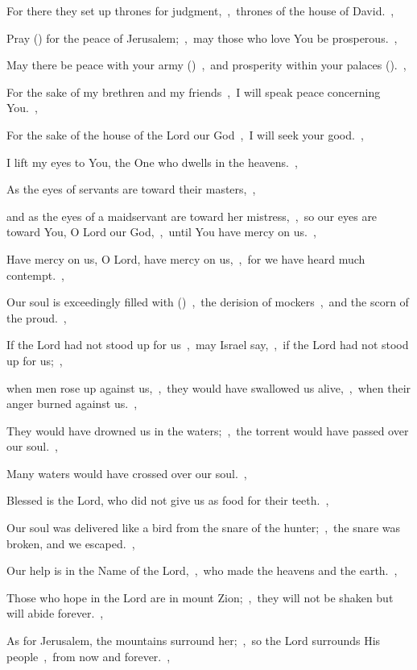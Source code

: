 \documentclass[12pt,twoside,a5paper]{article}
\begin{document}
\begin{halfparskip}
  For there they set up thrones for judgment,~\sep\ thrones of the house of David.~\sep

  Pray () for the peace of Jerusalem;~\sep\ may those who love You be prosperous.~\sep

  May there be peace with your army ()~\sep\ and prosperity within your palaces ().~\sep

  For the sake of my brethren and my friends~\sep\ I will speak peace concerning You.~\sep

  For the sake of the house of the Lord our God~\sep\ I will seek your good.~\sep

   I lift my eyes to You, the One who dwells in the heavens.~\sep

  As the eyes of servants are toward their masters,~\sep

  and as the eyes of a maidservant are toward her mistress,~\sep\ so our eyes are toward You, O Lord our God,~\sep\ until You have mercy on us.~\sep

  Have mercy on us, O Lord, have mercy on us,~\sep\ for we have heard much contempt.~\sep

  Our soul is exceedingly filled with ()~\sep\ the derision of mockers~\sep\ and the scorn of the proud.~\sep

   If the Lord had not stood up for us~\sep\ may Israel say,~\sep\ if the Lord had not stood up for us;~\sep

  when men rose up against us,~\sep\ they would have swallowed us alive,~\sep\ when their anger burned against us.~\sep

  They would have drowned us in the waters;~\sep\ the torrent would have passed over our soul.~\sep

  Many waters would have crossed over our soul.~\sep

  Blessed is the Lord, who did not give us as food for their teeth.~\sep

  Our soul was delivered like a bird from the snare of the hunter;~\sep\ the snare was broken, and we escaped.~\sep

  Our help is in the Name of the Lord,~\sep\ who made the heavens and the earth.~\sep

   Those who hope in the Lord are in mount Zion;~\sep\ they will not be shaken but will abide forever.~\sep

  As for Jerusalem, the mountains surround her;~\sep\ so the Lord surrounds His people~\sep\ from now and forever.~\sep


\end{halfparskip}
\end{document}
